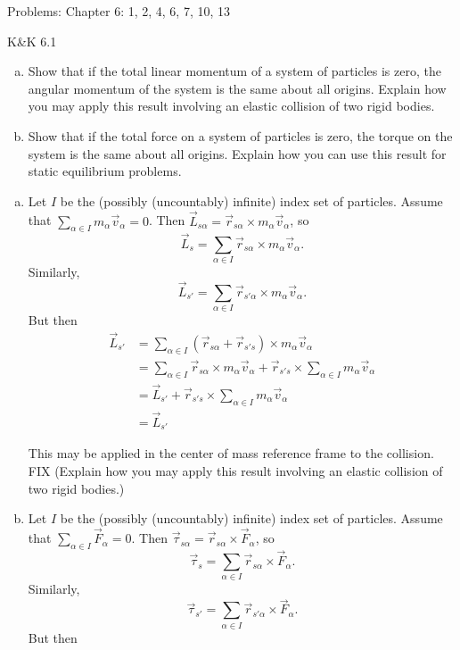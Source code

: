 \documentclass{esg8012pset}
\begin{document}
\noindent Problems: Chapter 6: 1, 2, 4, 6, 7, 10, 13


\begin{problem}{K\&K 6.1}
  \begin{enumerate}[(a)]
    \item Show that if the total linear momentum of a system of particles is zero, the angular momentum of the system is the same about all origins. Explain how you may apply this result involving an elastic collision of two rigid bodies.
    \item Show that if the total force on a system of particles is zero, the torque on the system is the same about all origins. Explain how you can use this result for static equilibrium problems.
  \end{enumerate}
\end{problem}
\begin{solution}
  \begin{enumerate}[(a)]
    \item Let $I$ be the (possibly (uncountably) infinite) index set of particles.  Assume that $\displaystyle \sum_{\alpha\in I} m_\alpha \vec v_\alpha = 0$.  Then $\vec L_{s\alpha} = \vec r_{s\alpha} \times m_\alpha \vec v_\alpha$, so $$\displaystyle \vec L_{s} = \sum_{\alpha\in I}\vec r_{s\alpha} \times m_\alpha \vec v_\alpha.$$  Similarly, $$\displaystyle \vec L_{s'} = \sum_{\alpha\in I}\vec r_{s'\alpha} \times m_\alpha \vec v_\alpha.$$  But then \begin{align*}
    \vec L_{s'} & = \sum_{\alpha\in I}(\vec r_{s\alpha} + \vec r_{s's}) \times m_\alpha \vec v_\alpha \\
    & = \sum_{\alpha\in I}\vec r_{s\alpha} \times m_\alpha \vec v_\alpha + \vec r_{s's} \times \sum_{\alpha\in I} m_\alpha \vec v_\alpha \\
    & = \vec L_{s'} + \vec r_{s's} \times \sum_{\alpha\in I} m_\alpha \vec v_\alpha \\
    & = \vec L_{s'}
    \end{align*} \par
    This may be applied in the center of mass reference frame to the collision.  FIX (Explain how you may apply this result involving an elastic collision of two rigid bodies.)
    \item Let $I$ be the (possibly (uncountably) infinite) index set of particles.  Assume that $\displaystyle \sum_{\alpha\in I} \vec F_\alpha = 0$.  Then $\vec \tau_{s\alpha} = \vec r_{s\alpha} \times \vec F_\alpha$, so $$\displaystyle \vec \tau_{s} = \sum_{\alpha\in I}\vec r_{s\alpha} \times \vec F_\alpha.$$  Similarly, $$\displaystyle \vec \tau_{s'} = \sum_{\alpha\in I}\vec r_{s'\alpha} \times \vec F_\alpha.$$  But then \begin{align*}

\end{align*}
\end{enumerate}
\end{solution}
\end{document}
